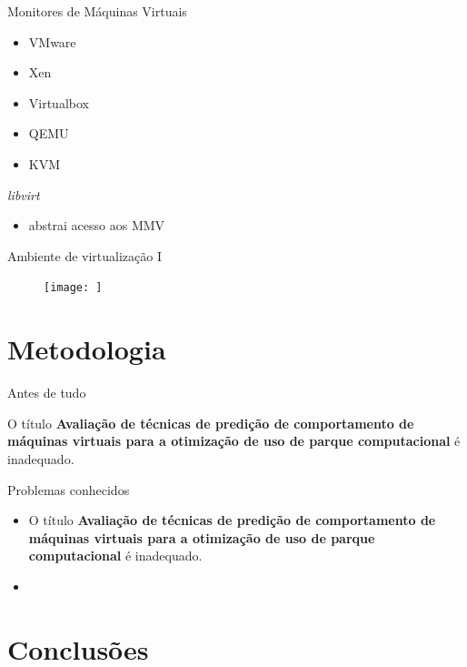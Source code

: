\documentclass{beamer}
\begin{document}
\begin{frame}{Monitores de Máquinas Virtuais}
\begin{itemize}
  \item VMware
  \item Xen
  \item Virtualbox
  \item QEMU
  \item KVM
\end{itemize}
\end{frame}

\begin{frame}{\emph{libvirt}}
\begin{itemize}
  \item abstrai acesso aos MMV
\end{itemize}
\end{frame}

\begin{frame}{Ambiente de virtualização I}
\begin{figure}
\centering
%
%
\texttt{[image: ]}
\end{figure}
\end{frame}

\section{Metodologia}

\begin{frame}{Antes de tudo}
\begin{block}{}
O título \textbf{Avaliação de técnicas de predição de comportamento de máquinas
virtuais para a otimização de uso de parque computacional} é inadequado.
\end{block}
\end{frame}

\begin{frame}{Problemas conhecidos}
\begin{itemize}
  \item O título \textbf{Avaliação de técnicas de predição de comportamento
        de máquinas virtuais para a otimização de uso de parque computacional} é
        inadequado.
  \item 
\end{itemize}
\end{frame}

\section{Conclusões}
\end{document}
